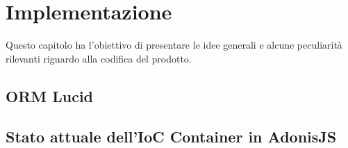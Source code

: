 
\chapter{Implementazione}
\label{cap:implementazione}
Questo capitolo ha l'obiettivo di presentare le idee generali e alcune peculiarità rilevanti riguardo alla codifica del prodotto.


\section{ORM Lucid}

\section{Stato attuale dell'IoC Container in AdonisJS}


